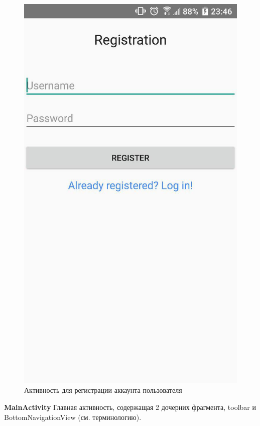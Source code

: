 \begin{my_enumerate}
\begin{figure}[h!]
            \includegraphics[height=0.42\textheight]{./screenshots/3/register.jpg}
            \caption{\small{Активность для регистрации аккаунта пользователя}}
            \label{register_activity}
            \endminipage
        \end{figure}
    \item \textbf{MainActivity} Главная активность, содержащая 2 дочерних
        фрагмента, toolbar и BottomNavigationView (см. терминологию).\\

\end{my_enumerate}
